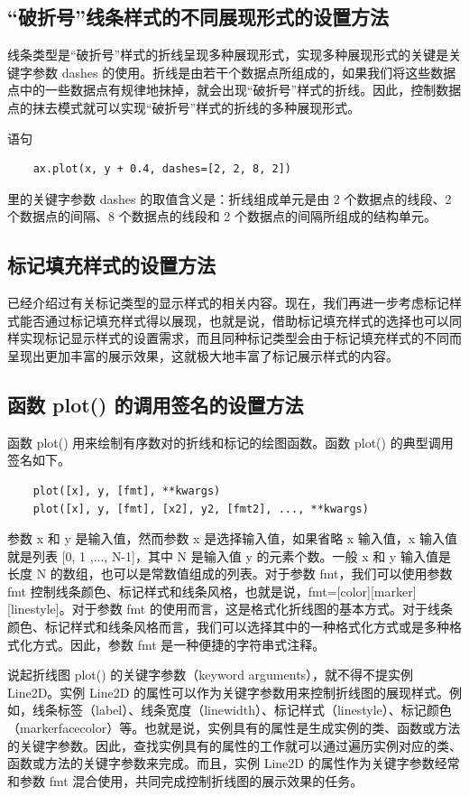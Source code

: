 \subsection{“破折号”线条样式的不同展现形式的设置方法}
线条类型是“破折号”样式的折线呈现多种展现形式，实现多种展现形式的关键是关键字参数 dashes 的使用。折线是由若干个数据点所组成的，如果我们将这些数据点中的一些数据点有规律地抹掉，就会出现“破折号”样式的折线。因此，控制数据点的抹去模式就可以实现“破折号”样式的折线的多种展现形式。

语句
\begin{verbatim}
    ax.plot(x, y + 0.4, dashes=[2, 2, 8, 2])
\end{verbatim}
里的关键字参数 dashes 的取值含义是：折线组成单元是由 2 个数据点的线段、2 个数据点的间隔、8 个数据点的线段和 2 个数据点的间隔所组成的结构单元。

\subsection{标记填充样式的设置方法}
已经介绍过有关标记类型的显示样式的相关内容。现在，我们再进一步考虑标记样式能否通过标记填充样式得以展现，也就是说，借助标记填充样式的选择也可以同样实现标记显示样式的设置需求，而且同种标记类型会由于标记填充样式的不同而呈现出更加丰富的展示效果，这就极大地丰富了标记展示样式的内容。
\subsection{函数 plot() 的调用签名的设置方法}
函数 plot() 用来绘制有序数对的折线和标记的绘图函数。函数 plot() 的典型调用签名如下。
\begin{verbatim}
    plot([x], y, [fmt], **kwargs)
    plot([x], y, [fmt], [x2], y2, [fmt2], ..., **kwargs)
\end{verbatim}

参数 x 和 y 是输入值，然而参数 x 是选择输入值，如果省略 x 输入值，x 输入值就是列表 [0, 1 ,..., N-1]，其中 N 是输入值 y 的元素个数。一般 x 和 y 输入值是长度 N 的数组，也可以是常数值组成的列表。对于参数 fmt，我们可以使用参数 fmt 控制线条颜色、标记样式和线条风格，也就是说，fmt=[color][marker][linestyle]。对于参数 fmt 的使用而言，这是格式化折线图的基本方式。对于线条颜色、标记样式和线条风格而言，我们可以选择其中的一种格式化方式或是多种格式化方式。因此，参数 fmt 是一种便捷的字符串式注释。

说起折线图 plot() 的关键字参数（keyword arguments），就不得不提实例 Line2D。实例 Line2D 的属性可以作为关键字参数用来控制折线图的展现样式。例如，线条标签（label）、线条宽度（linewidth）、标记样式（linestyle）、标记颜色（markerfacecolor）等。也就是说，实例具有的属性是生成实例的类、函数或方法的关键字参数。因此，查找实例具有的属性的工作就可以通过遍历实例对应的类、函数或方法的关键字参数来完成。而且，实例 Line2D 的属性作为关键字参数经常和参数 fmt 混合使用，共同完成控制折线图的展示效果的任务。

